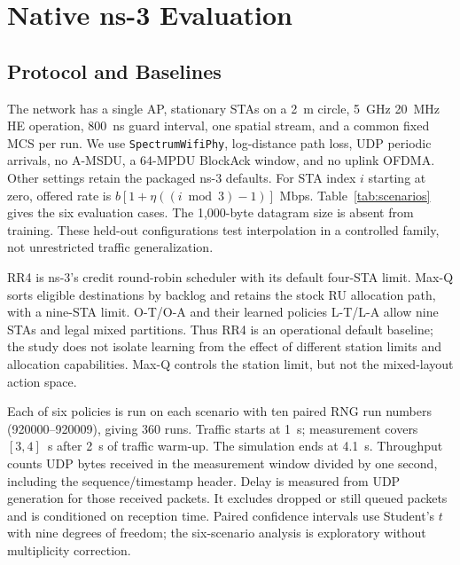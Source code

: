 \documentclass[lettersize,journal]{IEEEtran}
\begin{document}
\section{Native ns-3 Evaluation}
\subsection{Protocol and Baselines}

The network has a single AP, stationary STAs on a 2~m circle, 5~GHz
20~MHz HE operation, 800~ns guard interval, one spatial stream, and a common
fixed MCS per run. We use \texttt{SpectrumWifiPhy}, log-distance path loss,
UDP periodic arrivals, no A-MSDU, a 64-MPDU BlockAck window, and no uplink
OFDMA. Other settings retain the packaged ns-3 defaults. For STA index $i$
starting at zero, offered rate is $b[1+\eta((i\bmod3)-1)]$ Mbps.
Table~\ref{tab:scenarios} gives the six evaluation cases. The 1,000-byte
datagram size is absent from training. These held-out configurations test
interpolation in a controlled family, not unrestricted traffic generalization.

RR4 is ns-3's credit round-robin scheduler with its default four-STA limit.
Max-Q sorts eligible destinations by backlog and retains the stock RU
allocation path, with a nine-STA limit. O-T/O-A and their learned policies
L-T/L-A allow nine STAs and legal mixed partitions. Thus RR4 is an operational
default baseline; the study does not isolate learning from the effect of
different station limits and allocation capabilities. Max-Q controls the
station limit, but not the mixed-layout action space.

Each of six policies is run on each scenario with ten paired RNG run numbers
(920000--920009), giving 360 runs. Traffic starts at 1~s; measurement covers
$[3,4]$~s after 2~s of traffic warm-up. The simulation ends at 4.1~s.
Throughput counts UDP bytes received in the measurement window divided by
one second, including the sequence/timestamp header. Delay is measured from
UDP generation for those received packets. It excludes dropped or still
queued packets and is conditioned on reception time. Paired confidence
intervals use Student's $t$ with nine degrees of freedom; the six-scenario
analysis is exploratory without multiplicity correction.
\end{document}
